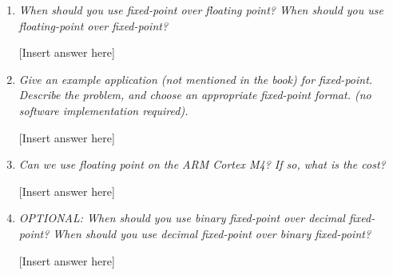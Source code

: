 \documentclass{article}
\begin{document}
\begin{enumerate}
	\item \emph{When should you use fixed-point over floating point? When should
		you use floating-point over fixed-point?}

		[Insert answer here]

	\item \emph{Give an example application (not mentioned in the book) for
		fixed-point. Describe the problem, and choose an appropriate
		fixed-point format. (no software implementation required).}

		[Insert answer here]

	\item \emph{Can we use floating point on the ARM Cortex M4? If so, what is
		the cost?}

		[Insert answer here]

	\item \emph{OPTIONAL: When should you use binary fixed-point over decimal fixed-point?
		When should you use decimal fixed-point over binary fixed-point?}

		[Insert answer here]

\end{enumerate}
\end{document}
